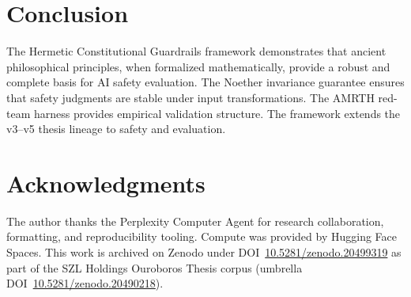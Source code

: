 \documentclass[11pt]{article}
\theoremstyle{plain}
\begin{document}
\section{Conclusion}

The Hermetic Constitutional Guardrails framework demonstrates that ancient philosophical principles, when formalized mathematically, provide a robust and complete basis for AI safety evaluation. The Noether invariance guarantee ensures that safety judgments are stable under input transformations. The AMRTH red-team harness provides empirical validation structure. The framework extends the v3–v5 thesis lineage to safety and evaluation.




\section*{Acknowledgments}
The author thanks the Perplexity Computer Agent for research collaboration, formatting, and
reproducibility tooling. Compute was provided by Hugging Face Spaces. This work is archived on
Zenodo under DOI~\href{https://doi.org/10.5281/zenodo.20499319}{10.5281/zenodo.20499319} as part of the SZL Holdings Ouroboros Thesis
corpus (umbrella DOI~\href{https://doi.org/10.5281/zenodo.20490218}{10.5281/zenodo.20490218}).

\nocite{03ref1,03ref2,03ref3,03ref4,03ref5,03ref6,03ref7,03ref8,03ref9,03ref10,03ref11}


\end{document}
